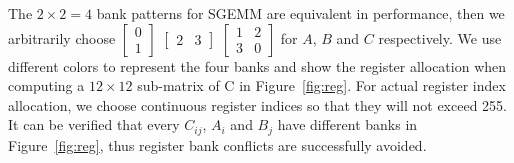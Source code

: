The $2\times2=4$ bank patterns for SGEMM are equivalent in performance, then we arbitrarily
choose $\begin{bmatrix} 0 \\ 1  \end{bmatrix}$ $\begin{bmatrix} 2 & 3 \end{bmatrix}$
    $\begin{bmatrix} 1 & 2 \\ 3 & 0  \end{bmatrix}$ for $A$, $B$ and $C$ respectively.
We use different colors to represent the four banks and show the register allocation when computing a $12 \times 12$ sub-matrix of C in Figure~\ref{fig:reg}.
For actual register index allocation, we choose continuous register indices so that they will not exceed 255.
It can be verified that every $C_{ij}$, $A_i$ and $B_j$ have different banks in Figure~\ref{fig:reg}, thus register bank conflicts are successfully avoided.
